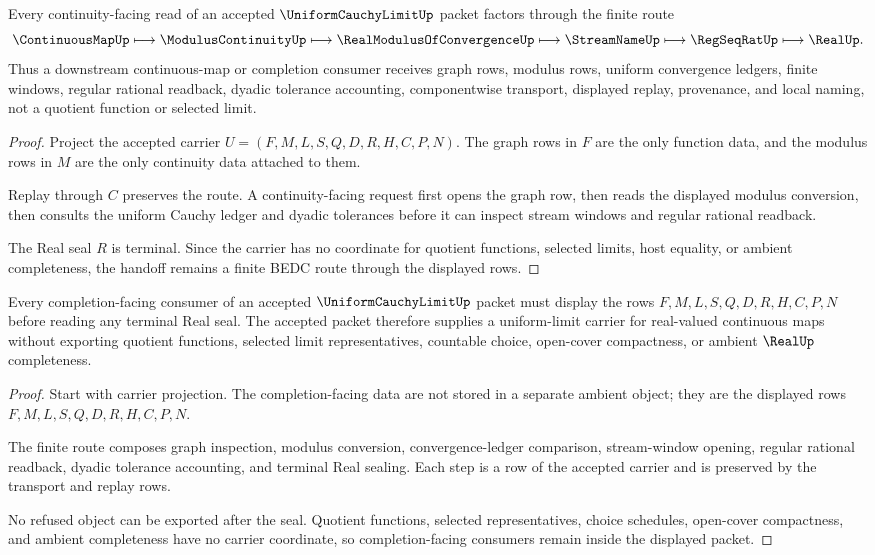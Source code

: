 \begin{theorem}
\label{thm:uniform-cauchy-limit-continuity-handoff}
Every continuity-facing read of an accepted $\UniformCauchyLimitUp$ packet factors through the finite route
$$
\ContinuousMapUp
\longmapsto
\ModulusContinuityUp
\longmapsto
\RealModulusOfConvergenceUp
\longmapsto
\StreamNameUp
\longmapsto
\RegSeqRatUp
\longmapsto
\RealUp .
$$
Thus a downstream continuous-map or completion consumer receives graph rows, modulus rows, uniform convergence ledgers, finite windows, regular rational readback, dyadic tolerance accounting, componentwise transport, displayed replay, provenance, and local naming, not a quotient function or selected limit.
\end{theorem}
\begin{proof}
Project the accepted carrier $U=(F,M,L,S,Q,D,R,H,C,P,N)$. The graph rows in $F$ are the only function data, and the modulus rows in $M$ are the only continuity data attached to them.

Replay through $C$ preserves the route. A continuity-facing request first opens the graph row, then reads the displayed modulus conversion, then consults the uniform Cauchy ledger and dyadic tolerances before it can inspect stream windows and regular rational readback.

The Real seal $R$ is terminal. Since the carrier has no coordinate for quotient functions, selected limits, host equality, or ambient completeness, the handoff remains a finite BEDC route through the displayed rows.
\end{proof}

\begin{theorem}
\label{thm:uniform-cauchy-limit-completion-nonescape}
Every completion-facing consumer of an accepted $\UniformCauchyLimitUp$ packet must display the rows $F,M,L,S,Q,D,R,H,C,P,N$ before reading any terminal Real seal. The accepted packet therefore supplies a uniform-limit carrier for real-valued continuous maps without exporting quotient functions, selected limit representatives, countable choice, open-cover compactness, or ambient $\RealUp$ completeness.
\end{theorem}
\begin{proof}
Start with carrier projection. The completion-facing data are not stored in a separate ambient object; they are the displayed rows $F,M,L,S,Q,D,R,H,C,P,N$.

The finite route composes graph inspection, modulus conversion, convergence-ledger comparison, stream-window opening, regular rational readback, dyadic tolerance accounting, and terminal Real sealing. Each step is a row of the accepted carrier and is preserved by the transport and replay rows.

No refused object can be exported after the seal. Quotient functions, selected representatives, choice schedules, open-cover compactness, and ambient completeness have no carrier coordinate, so completion-facing consumers remain inside the displayed packet.
\end{proof}

